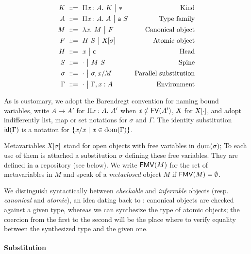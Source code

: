 \documentclass[9pt]{sigplanconf}
\begin{document}
\begin{align*}
  K &\ ::=\ 
  \Pi{\ensuremath{\text{\textit{x}}}}:{A}.\  K \ {\big|}\ 
  \mathsf{*} &
  \text{Kind}\\
  A &\ ::=\ 
  \Pi{\ensuremath{\text{\textit{x}}}}:{A}.\  A \ {\big|}\ 
  {\text{\textsf{a}}}\  S &
  \text{Type family} \\
  M &\ ::=\ 
  \lambda{\ensuremath{\text{\textit{x}}}}.\  M \ {\big|}\ 
  F &
  \text{Canonical object} \\
  F &\ ::=\  {H}\  S
  \ {\big|}\ 
  {\text{\textsl{X}}}[{\sigma}] &
  \text{Atomic object} \\
  H &\ ::=\ 
  \text{\textit{x}} \ {\big|}\ 
  \text{\textsf{c}} &
  \text{Head}\\
  S &\ ::=\ 
  \cdot \ {\big|}\ 
  {M}\ {S} &
  \text{Spine}\\
  \sigma &\ ::=\ 
  \cdot \ {\big|}\ 
  {\sigma},{{\text{\textit{x}}}/{M}} &
  \text{Parallel substitution} \\
  \Gamma &\ ::=\ 
  \cdot \ {\big|}\ 
  {\Gamma},{{\text{\textit{x}}}:{A}} &
  \text{Environment}
\end{align*}

As is customary, we adopt the Barendregt convention for naming bound
variables, write $A\to A'$ for $\Pi{\ensuremath{\text{\textit{x}}}}:{A}.\  A'$ when $\text{\textit{x}}\notin {\text{\textsf{FV}}}({A'})$,
$\text{\textsl{X}}$ for ${\text{\textsl{X}}}[{\cdot}]$, and adopt indifferently list, map
or set notations for $\sigma$ and $\Gamma$. The identity substitution
${\text{\textsf{id}}}({\Gamma})$ is a notation for $\{{\text{\textit{x}}}/{\text{\textit{x}}}\ |\ \text{\textit{x}}
\in\operatorname{dom}{\!(\Gamma)}\}$.

Metavariables ${\text{\textsl{X}}}[{\sigma}]$ stand for open objects with free
variables in $\operatorname{dom}{\!(\sigma)}$; To each use of them is attached a
substitution $\sigma$ defining these free variables. They are defined
in a repository (see below). We write ${\text{\textsf{FMV}}}({M})$ for the set of
metavariables in $M$ and speak of a \emph{metaclosed} object $M$ if
${\text{\textsf{FMV}}}({M}) = \emptyset$.

We distinguish syntactically between \emph{checkable} and
\emph{inferrable} objects (resp. \emph{canonical} and \emph{atomic}),
an idea dating back to \cite{pierce2000local}: canonical objects are
checked against a given type, whereas we can synthesize the type of
atomic objects; the coercion from the first to the second will be the
place where to verify equality between the synthesized type and the
given one.

\paragraph{Substitution}
\end{document}
